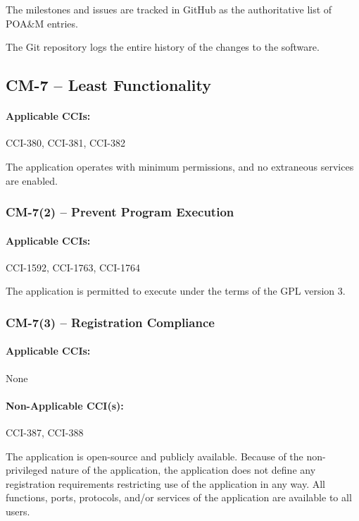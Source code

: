 \documentclass[letterpaper, 10pt, twoside]{article}
\begin{document}
The milestones and issues are tracked in GitHub as the authoritative list of POA\&M entries.

The Git repository logs the entire history of the changes to the software.

\subsection{CM-7 -- Least Functionality}

\paragraph{Applicable CCIs:} CCI-380, CCI-381, CCI-382

The application operates with minimum permissions, and no extraneous services are enabled.

\subsubsection{CM-7(2) -- Prevent Program Execution}

\paragraph{Applicable CCIs:} CCI-1592, CCI-1763, CCI-1764

The application is permitted to execute under the terms of the GPL version 3.

\subsubsection{CM-7(3) -- Registration Compliance}

\paragraph{Applicable CCIs:} None

\paragraph{Non-Applicable CCI(s):} CCI-387, CCI-388

The application is open-source and publicly available. Because of the non-privileged nature of the application, the application does not define any registration requirements restricting use of the application in any way. All functions, ports, protocols, and/or services of the application are available to all users.
\end{document}
